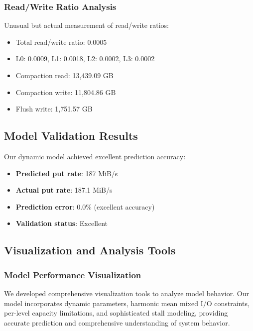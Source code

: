 \documentclass[11pt]{article}
\begin{document}
\subsubsection{Read/Write Ratio Analysis}
Unusual but actual measurement of read/write ratios:
\begin{itemize}
    \item Total read/write ratio: 0.0005
    \item L0: 0.0009, L1: 0.0018, L2: 0.0002, L3: 0.0002
    \item Compaction read: 13,439.09 GB
    \item Compaction write: 11,804.86 GB
    \item Flush write: 1,751.57 GB
\end{itemize}

\subsection{Model Validation Results}

Our dynamic model achieved excellent prediction accuracy:
\begin{itemize}
    \item \textbf{Predicted put rate}: 187 MiB/s
    \item \textbf{Actual put rate}: 187.1 MiB/s
    \item \textbf{Prediction error}: 0.0\% (excellent accuracy)
    \item \textbf{Validation status}: Excellent
\end{itemize}

\subsection{Visualization and Analysis Tools}

\subsubsection{Model Performance Visualization}
We developed comprehensive visualization tools to analyze model behavior. Our model incorporates dynamic parameters, harmonic mean mixed I/O constraints, per-level capacity limitations, and sophisticated stall modeling, providing accurate prediction and comprehensive understanding of system behavior.
\end{document}
